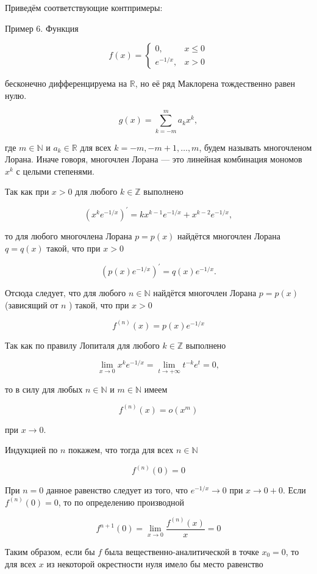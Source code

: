 \documentclass[a4paper,12pt]{article} %
\begin{document}
Приведём соответствующие контпримеры:

Пример 6. Функция

$$
f(x)= \begin{cases}0, & x \leq 0 \\ e^{-1 / x}, & x>0\end{cases}
$$

бесконечно дифференцируема на $\mathbb{R}$, но её ряд Маклорена тождественно равен нулю.

$$
g(x)=\sum_{k=-m}^{m} a_{k} x^{k},
$$

где $m \in \mathbb{N}$ и $a_{k} \in \mathbb{R}$ для всех $k=-m,-m+1, \ldots, m$, будем называть многочленом Лорана. Иначе говоря, многочлен Лорана — это линейная комбинация мономов $x^{k}$ с целыми степенями.

Так как при $x>0$ для любого $k \in \mathbb{Z}$ выполнено

$$
\left(x^{k} e^{-1 / x}\right)^{\prime}=k x^{k-1} e^{-1 / x}+x^{k-2} e^{-1 / x},
$$

то для любого многочлена Лорана $p=p(x)$ найдётся многочлен Лорана $q=q(x)$ такой, что при $x>0$

$$
\left(p(x) e^{-1 / x}\right)^{\prime}=q(x) e^{-1 / x} .
$$

Отсюда следует, что для любого $n \in \mathbb{N}$ найдётся многочлен Лорана $p=p(x)$ (зависящий от $n$ ) такой, что при $x>0$

$$
f^{(n)}(x)=p(x) e^{-1 / x}
$$

Так как по правилу Лопиталя для любого $k \in \mathbb{Z}$ выполнено

$$
\lim _{x \rightarrow 0} x^{k} e^{-1 / x}=\lim _{t \rightarrow+\infty} t^{-k} e^{t}=0,
$$

то в силу для любых $n \in \mathbb{N}$ и $m \in \mathbb{N}$ имеем

$$
f^{(n)}(x)=o\left(x^{m}\right)
$$

при $x \rightarrow 0$.

Индукцией по $n$ покажем, что тогда для всех $n \in \mathbb{N}$

$$
f^{(n)}(0)=0
$$

При $n=0$ данное равенство следует из того, что $e^{-1 / x} \rightarrow 0$ при $x \rightarrow 0+0$. Если $f^{(n)}(0)=0$, то по определению производной

$$
f^{n+1}(0)=\lim _{x \rightarrow 0} \frac{f^{(n)}(x)}{x}=0
$$

Таким образом, если бы $f$ была вещественно-аналитической в точке $x_{0}=0$, то для всех $x$ из некоторой окрестности нуля имело бы место равенство
\end{document}
